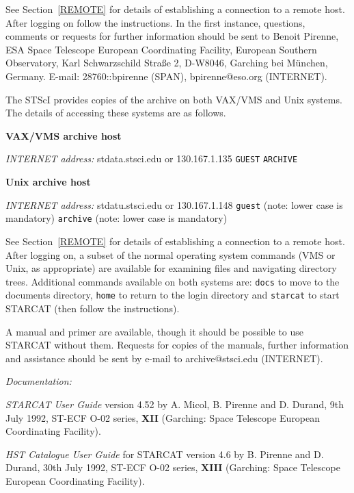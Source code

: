 \documentclass[twoside,11pt]{article}
\begin{document}
See Section~\ref{REMOTE} for details of establishing a connection to
a remote host. After logging on follow the instructions. In the first 
instance, questions, comments or requests for further information should
be sent to Benoit Pirenne, ESA Space Telescope European Coordinating
Facility, European Southern Observatory, Karl Schwarzschild Stra\ss e 2,
D-W8046, Garching bei M\"{u}nchen, Germany. E-mail: 28760::bpirenne 
(SPAN), bpirenne@eso.org (INTERNET).

The STScI provides copies of the archive on both VAX/VMS and Unix 
systems. The details of accessing these systems are as follows.

{\bf VAX/VMS archive host}

{\it INTERNET address:} stdata.stsci.edu or 130.167.1.135
 \verb-GUEST-
 \verb-ARCHIVE-

{\bf Unix archive host}

{\it INTERNET address:} stdatu.stsci.edu or 130.167.1.148
 \verb-guest- (note: lower case is mandatory) 
 \verb-archive- (note: lower case is mandatory) 

See Section~\ref{REMOTE} for details of establishing a connection to
a remote host. After logging on, a subset of the normal operating system
commands (VMS or Unix, as appropriate) are available for examining files
and navigating directory trees. Additional commands available on both
systems are: \verb-docs- to move to the documents directory, \verb-home-
to return to the login directory and \verb-starcat- to start STARCAT 
(then follow the instructions).

A manual and primer are available, though it should be possible to use
STARCAT without them. Requests for copies of the manuals, further 
information and assistance should be sent by e-mail to archive@stsci.edu
(INTERNET).

{\it Documentation:}

{\it STARCAT User Guide} version 4.52 by A. Micol, B. Pirenne and
D. Durand, 9th July 1992, ST-ECF O-02 series, {\bf XII} (Garching:
Space Telescope European Coordinating Facility).

{\it HST Catalogue User Guide} for STARCAT version 4.6 by B. Pirenne and
D. Durand, 30th July 1992, ST-ECF O-02 series, {\bf XIII} (Garching:
Space Telescope European Coordinating Facility).
\end{document}
